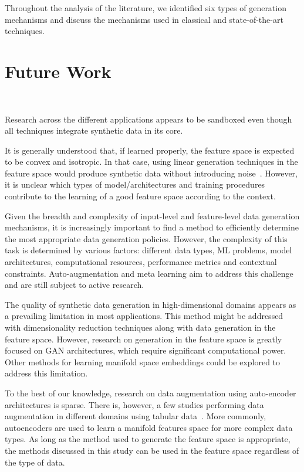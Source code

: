 \documentclass[parskip=full]{scrartcl}
\begin{document}
Throughout the analysis of the literature, we identified six types of
generation mechanisms and discuss the mechanisms used in classical and
state-of-the-art techniques.



\section{Future Work}~\label{sec:future-work}

Research across the different applications appears to be sandboxed even though
all techniques integrate synthetic data in its core.

It is generally understood that, if learned properly, the feature space is
expected to be convex and isotropic. In that case, using linear generation
techniques in the feature space would produce synthetic data without
introducing noise~\cite{cheung2020modals}. However, it is unclear which types
of model/architectures and training procedures contribute to the learning of a
good feature space according to the context.

Given the breadth and complexity of input-level and feature-level data
generation mechanisms, it is increasingly important to find a method to
efficiently determine the most appropriate data generation policies. However,
the complexity of this task is determined by various factors: different data
types, ML problems, model architectures, computational resources, performance
metrics and contextual constraints. Auto-augmentation and meta learning aim to
address this challenge and are still subject to active research.

The quality of synthetic data generation in high-dimensional domains appears
as a prevailing limitation in most applications. This method might be
addressed with dimensionality reduction techniques along with data generation
in the feature space. However, research on generation in the feature space is
greatly focused on GAN architectures, which require significant computational
power. Other methods for learning manifold space embeddings could be explored
to address this limitation.

To the best of our knowledge, research on data augmentation using auto-encoder
architectures is sparse. There is, however, a few studies performing data
augmentation in different domains using tabular data~\cite{delgado2021deep}.
More commonly, autoencoders are used to learn a manifold features space for
more complex data types. As long as the method used to generate the feature
space is appropriate, the methods discussed in this study can be used in the
feature space regardless of the type of data.
\end{document}

